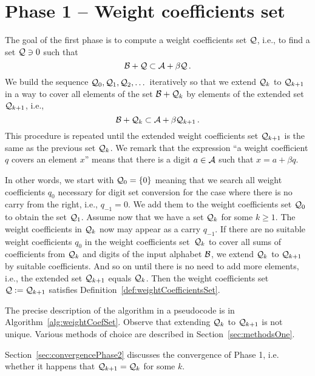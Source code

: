 \section{Phase 1 -- Weight coefficients set}
\label{subsec:phase1}
The goal of the first phase is to compute a weight coefficients set $\mathcal{Q}$, i.e., to find a set $\mathcal{Q} \ni 0$ such that 
$$
    \mathcal{B} + \mathcal{Q} \subset \mathcal{A} + \beta \mathcal{Q}\,.
$$  
We build the sequence $\mathcal{Q}_0, \mathcal{Q}_1, \mathcal{Q}_2,\dots$ iteratively so that we extend $\mathcal{Q}_k$ to $\mathcal{Q}_{k+1}$ in a way to cover all elements of the set $\mathcal{B}+\mathcal{Q}_k$ by elements of the extended set $\mathcal{Q}_{k+1}$, i.e.,
$$
\mathcal{B}+ \mathcal{Q}_k \subset \mathcal{A} + \beta \mathcal{Q}_{k+1}\,.
$$
This procedure is repeated until the extended weight coefficients set $\mathcal{Q}_{k+1}$ is the same as the previous set $\mathcal{Q}_{k}$. We remark that the expression ``a weight coefficient $q$ covers an element $x$'' means that there is a digit $a \in \mathcal{A}$ such that $x=a + \beta q$. 

In other words, we start with $\mathcal{Q}_0=\{0\}$ meaning that we search all weight coefficients $q_0$ necessary for digit set conversion for the case where there is no carry from the right, i.e., $q_{-1}=0$. We add them to the weight coefficients set $\mathcal{Q}_0$ to obtain the set $\mathcal{Q}_1$. Assume now that we have a set $\mathcal{Q}_k$ for some $k\geq 1$. The weight coefficients in $\mathcal{Q}_k$ now may appear as a carry $q_{-1}$. If there are no suitable weight coefficients $q_0$ in the weight coefficients set~$\mathcal{Q}_k$ to cover all sums of coefficients from $\mathcal{Q}_k$ and digits of the input alphabet $\mathcal{B}$, we extend $\mathcal{Q}_k$ to $\mathcal{Q}_{k+1}$ by  suitable coefficients. And so on until there is no need to add more elements, i.e., the extended set $\mathcal{Q}_{k+1}$ equals $\mathcal{Q}_k$. Then the weight coefficients set $\mathcal{Q}:=\mathcal{Q}_{k+1}$ satisfies Definition~\ref{def:weightCoefficientsSet}. 


The precise description of the algorithm in a pseudocode is in Algorithm~\ref{alg:weightCoefSet}. Observe that extending $\mathcal{Q}_k$ to $\mathcal{Q}_{k+1}$ is not unique. Various methods of choice are described in Section~\ref{sec:methodsOne}.    
    



Section~\ref{sec:convergencePhase2} discusses the convergence of Phase 1, i.e. whether it happens that  $\mathcal{Q}_{k+1}=\mathcal{Q}_k$ for some  $k$.
    
